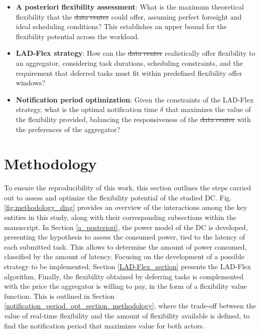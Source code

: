 \documentclass[preprint,12pt]{elsarticle}
\makeatletter
\providecommand{\DIFaddtex}[1]{{\protect\color{blue}\uwave{#1}}} %
\providecommand{\DIFdeltex}[1]{{\protect\color{red}\sout{#1}}} %
\providecommand{\DIFaddbegin}{} %
\providecommand{\DIFaddend}{} %
\providecommand{\DIFdelbegin}{} %
\providecommand{\DIFdelend}{} %
\providecommand{\DIFadd}[1]{\texorpdfstring{\DIFaddtex{#1}}{#1}} %
\providecommand{\DIFdel}[1]{\texorpdfstring{\DIFdeltex{#1}}{}} %
\providecommand{\DIFscaledelfig}{0.5}
\newlength{\DIFdelgraphicswidth} %
\newlength{\DIFdelgraphicsheight} %
\providecommand{\DIFaddincludegraphics}[2][]{{\color{blue}\fbox{\DIFOincludegraphics[#1]{#2}}}} %
\providecommand{\DIFdelincludegraphics}[2][]{%
\sbox{\DIFdelgraphicsbox}{\DIFOincludegraphics[#1]{#2}}%
\settoboxwidth{\DIFdelgraphicswidth}{\DIFdelgraphicsbox} %
\settoboxtotalheight{\DIFdelgraphicsheight}{\DIFdelgraphicsbox} %
\scalebox{\DIFscaledelfig}{%
\parbox[b]{\DIFdelgraphicswidth}{\usebox{\DIFdelgraphicsbox}\\[-\baselineskip] \rule{\DIFdelgraphicswidth}{0em}}\llap{\resizebox{\DIFdelgraphicswidth}{\DIFdelgraphicsheight}{%
\setlength{\unitlength}{\DIFdelgraphicswidth}%
\begin{picture}(1,1)%
\thicklines\linethickness{2pt} %
{\color[rgb]{1,0,0}\put(0,0){\framebox(1,1){}}}%
{\color[rgb]{1,0,0}\put(0,0){\line( 1,1){1}}}%
{\color[rgb]{1,0,0}\put(0,1){\line(1,-1){1}}}%
\end{picture}%
}\hspace*{3pt}}} %
} %
\DeclareRobustCommand{\DIFaddbegin}{\DIFOaddbegin \let\includegraphics\DIFaddincludegraphics} %
\DeclareRobustCommand{\DIFaddend}{\DIFOaddend \let\includegraphics\DIFOincludegraphics} %
\DeclareRobustCommand{\DIFdelbegin}{\DIFOdelbegin \let\includegraphics\DIFdelincludegraphics} %
\DeclareRobustCommand{\DIFdelend}{\DIFOaddend \let\includegraphics\DIFOincludegraphics} %
\let\sout@orig\sout %
\renewcommand{\sout}[1]{\ifmmode\text{\sout@orig{\ensuremath{#1}}}\else\sout@orig{#1}\fi} %
\makeatother
\begin{document}
\begin{itemize}
    \item \textbf{A posteriori flexibility assessment}: What is the maximum theoretical flexibility that the \DIFdelbegin \DIFdel{data center }\DIFdelend \DIFaddbegin \DIFadd{DC }\DIFaddend could offer, assuming perfect foresight and ideal scheduling conditions? This establishes an upper bound for the flexibility potential across the workload.

    \item \textbf{LAD-Flex strategy}: How can the \DIFdelbegin \DIFdel{data center }\DIFdelend \DIFaddbegin \DIFadd{DC }\DIFaddend realistically offer flexibility to an aggregator, considering task durations, scheduling constraints, and the requirement that deferred tasks must fit within predefined flexibility offer windows?

    \item \textbf{Notification period optimization}: Given the constraints of the LAD-Flex strategy, what is the optimal notification time $\delta$ that maximizes the value of the flexibility provided, balancing the responsiveness of the \DIFdelbegin \DIFdel{data center }\DIFdelend \DIFaddbegin \DIFadd{DC }\DIFaddend with the preferences of the aggregator?
\end{itemize}
\section{Methodology}\label{methodology}
To ensure the reproducibility of this work, this section outlines the steps carried out to assess and optimize the flexibility potential of the studied DC. Fig. \ref{fig:methodology_diag} provides an overview of the interactions among the key entities in this study, along with their corresponding subsections within the manuscript. In Section \ref{a_posteriori}, the power model of the DC is developed, presenting the hypothesis to assess the consumed power, tied to the latency of each submitted task. This allows to determine the amount of power consumed, classified by the amount of latency. Focusing on the development of a possible strategy to be implemented, Section \ref{LAD-Flex_section} presents the LAD-Flex algorithm. Finally, the flexibility obtained by deferring tasks is complemented with the price the aggregator is willing to pay, in the form of a flexibility value function. This is outlined in Section \ref{notification_period_opt_section_methodology}, where the trade-off between the value of real-time flexibility and the amount of flexibility available is defined, to find the notification period that maximizes value for both actors.
\end{document}
